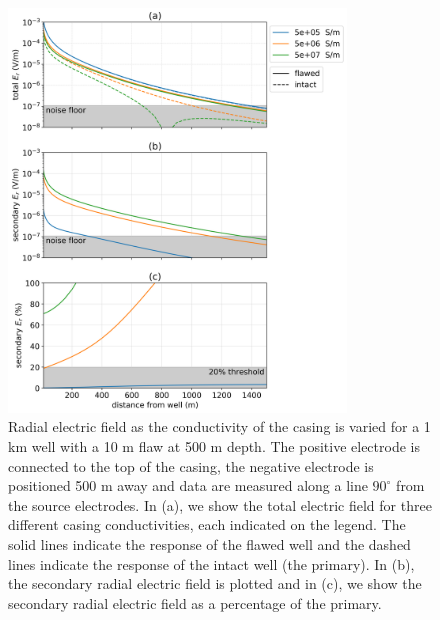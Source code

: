 \begin{figure}
    \begin{center}
    \includegraphics[width=0.8\textwidth]{figures/dc_casing/integrity_conductivity_casing.png}
    \end{center}
\caption{
    Radial electric field as the conductivity of the casing is varied for a 1 km well with a 10 m flaw at 500 m depth.
    The positive electrode is connected to the top of the casing, the negative electrode
    is positioned 500 m away and data are measured along a line $90^\circ$ from the
    source electrodes. In (a), we show the total electric field for three different casing conductivities,
    each indicated on the legend. The solid lines indicate the response of the flawed well and the dashed lines indicate the response of the intact well (the primary).
    In (b), the secondary radial electric field is plotted and in (c), we show the
    secondary radial electric field as a percentage of the primary.
}
\label{fig:integrity_conductivity_casing}
\end{figure}
